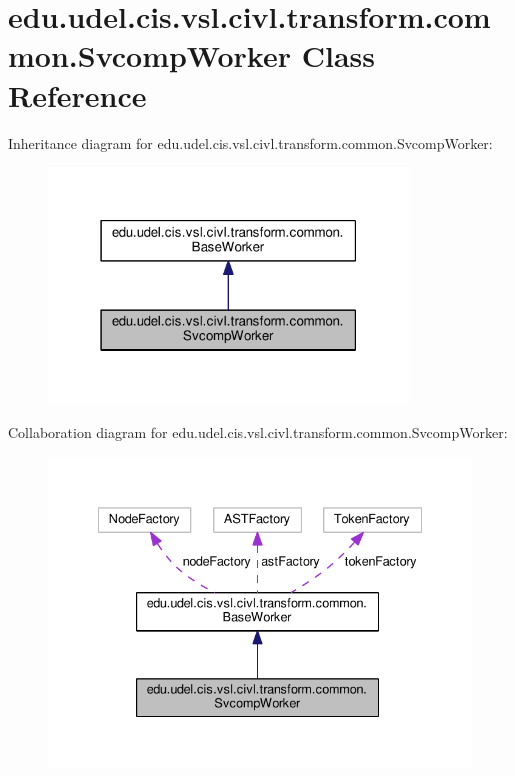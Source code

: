 \hypertarget{classedu_1_1udel_1_1cis_1_1vsl_1_1civl_1_1transform_1_1common_1_1SvcompWorker}{}\section{edu.\+udel.\+cis.\+vsl.\+civl.\+transform.\+common.\+Svcomp\+Worker Class Reference}
\label{classedu_1_1udel_1_1cis_1_1vsl_1_1civl_1_1transform_1_1common_1_1SvcompWorker}


Inheritance diagram for edu.\+udel.\+cis.\+vsl.\+civl.\+transform.\+common.\+Svcomp\+Worker\+:
\nopagebreak
\begin{figure}[H]
\begin{center}
\leavevmode
\includegraphics[width=271pt]{classedu_1_1udel_1_1cis_1_1vsl_1_1civl_1_1transform_1_1common_1_1SvcompWorker__inherit__graph}
\end{center}
\end{figure}


Collaboration diagram for edu.\+udel.\+cis.\+vsl.\+civl.\+transform.\+common.\+Svcomp\+Worker\+:
\nopagebreak
\begin{figure}[H]
\begin{center}
\leavevmode
\includegraphics[width=335pt]{classedu_1_1udel_1_1cis_1_1vsl_1_1civl_1_1transform_1_1common_1_1SvcompWorker__coll__graph}
\end{center}
\end{figure}
